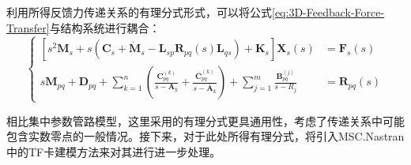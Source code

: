 利用所得反馈力传递关系的有理分式形式，可以将公式\eqref{eq:3D-Feedback-Force-Transfer}与结构系统进行耦合：
\begin{equation}
	\left \{
	\label{eq:3D-Coupled-System-Transfer}
	\begin{aligned}
	\left[s^2 \boldsymbol{M}_s+ s\left(\boldsymbol{C}_s+\boldsymbol{\dot{M}}_s
	-\boldsymbol{L}_{sp} \boldsymbol{R}_{pq}(s)\boldsymbol{L}_{qs}\right)+ \boldsymbol{K}_s \right]\boldsymbol{X}_s(s)&=\boldsymbol{F}_s(s) \\
	s\boldsymbol{M}_{pq}+ \boldsymbol{D}_{pq}+ \sum_{k=1}^n
	\left( \frac{\boldsymbol{C}_{pq}^{(k)}}{s-\boldsymbol{A}_k} +
	\frac{\bar{\boldsymbol{C}}_{pq}^{(k)}}{s-\bar{\boldsymbol{A}}_k}  \right)
	+ \sum_{j=1}^{m}\frac{\boldsymbol{B}_{pq}^{(j)}}{s-R_j}&=\boldsymbol{R}_{pq}(s)
	\end{aligned} \right.
\end{equation}

相比集中参数管路模型，这里采用的有理分式更具通用性，考虑了传递关系中可能包含实数零点的一般情况。接下来，对于此处所得有理分式，将引入MSC.Nastran中的TF卡建模方法来对其进行进一步处理。

